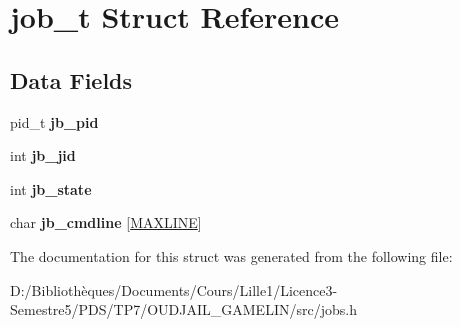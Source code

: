 \hypertarget{structjob__t}{}\section{job\+\_\+t Struct Reference}
\label{structjob__t}
\subsection*{Data Fields}
\begin{DoxyCompactItemize}
\item 
\hypertarget{structjob__t_a82fe3c0cecc3c72f11036d28a9679832}{}pid\+\_\+t {\bfseries jb\+\_\+pid}\label{structjob__t_a82fe3c0cecc3c72f11036d28a9679832}

\item 
\hypertarget{structjob__t_a92658a57dc4aaedcb04db49117b4f724}{}int {\bfseries jb\+\_\+jid}\label{structjob__t_a92658a57dc4aaedcb04db49117b4f724}

\item 
\hypertarget{structjob__t_a749b836667db3e8ff7c09fd16a80abbe}{}int {\bfseries jb\+\_\+state}\label{structjob__t_a749b836667db3e8ff7c09fd16a80abbe}

\item 
\hypertarget{structjob__t_af10055dc942d27ceae15c85513aae3f3}{}char {\bfseries jb\+\_\+cmdline} \mbox{[}\hyperlink{common_8h_a3e937c42922f7601edb17b747602c471}{M\+A\+X\+L\+I\+N\+E}\mbox{]}\label{structjob__t_af10055dc942d27ceae15c85513aae3f3}

\end{DoxyCompactItemize}


The documentation for this struct was generated from the following file\+:\begin{DoxyCompactItemize}
\item 
D\+:/\+Bibliothèques/\+Documents/\+Cours/\+Lille1/\+Licence3-\/\+Semestre5/\+P\+D\+S/\+T\+P7/\+O\+U\+D\+J\+A\+I\+L\+\_\+\+G\+A\+M\+E\+L\+I\+N/src/jobs.\+h\end{DoxyCompactItemize}
